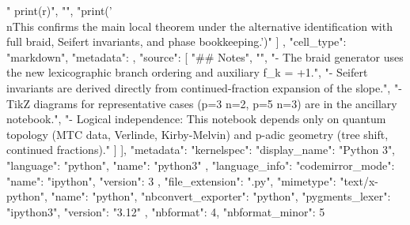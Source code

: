 {{        "    print(r)\n",
        "\n",
        "print('\\nThis confirms the main local theorem under the alternative identification with full braid, Seifert invariants, and phase bookkeeping.')"
      ]
    },
    {
      "cell_type": "markdown",
      "metadata": {},
      "source": [
        "## Notes\n",
        "\n",
        "- The braid generator uses the new lexicographic branch ordering and auxiliary f_k = +1.\n",
        "- Seifert invariants are derived directly from continued-fraction expansion of the slope.\n",
        "- TikZ diagrams for representative cases (p=3 n=2, p=5 n=3) are in the ancillary notebook.\n",
        "- Logical independence: This notebook depends only on quantum topology (MTC data, Verlinde, Kirby-Melvin) and p-adic geometry (tree shift, continued fractions)."
      ]
    }
  ],
  "metadata": {
    "kernelspec": {
      "display_name": "Python 3",
      "language": "python",
      "name": "python3"
    },
    "language_info": {
      "codemirror_mode": {
        "name": "ipython",
        "version": 3
      },
      "file_extension": ".py",
      "mimetype": "text/x-python",
      "name": "python",
      "nbconvert_exporter": "python",
      "pygments_lexer": "ipython3",
      "version": "3.12"
    }
  },
  "nbformat": 4,
  "nbformat_minor": 5
}